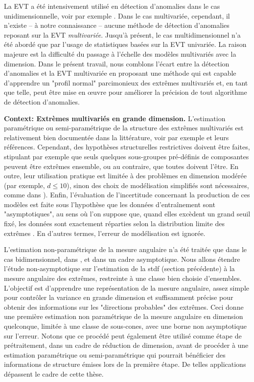 \documentclass[a4paper, 12pt]{article}
\begin{document}
La EVT a été intensivement utilisé en détection d'anomalies dans le cas unidimensionnelle, voir par exemple \cite{Roberts99, Roberts2000, Clifton2011, Clifton2008, Lee2008}. Dans le cas multivariée, cependant, il n'existe -- à notre connaissance -- aucune méthode de détection d'anomalies reposant sur la EVT \textit {multivariée}. Jusqu'à présent, le cas multidimensionnel n'a été abordé que par l'usage de statistiques basées sur la EVT univariée. La raison majeure est la difficulté du passage à l'échelle des modèles multivariés avec la dimension. Dans le présent travail, nous comblons l'écart entre la détection d'anomalies et la EVT multivariée en proposant une méthode qui est capable d'apprendre un "profil normal" parcimonieux des extrêmes multivariés et, en tant que telle, peut être mise en œuvre pour améliorer la précision de tout algorithme de détection d'anomalies.


\textbf{Context: Extrèmes multivariés en grande dimension.}
L'estimation paramétrique ou semi-paramétrique de la structure des extrêmes multivariés est relativement bien documentée dans la littérature, voir par exemple
\cite{coles1991modeling,fougeres2009models,cooley2010pairwise,sabourinNaveau2012} 
et leurs références. Cependant, des hypothèses structurelles restrictives doivent être faites, stipulant par exemple que seuls quelques sous-groupes pré-définis de composantes peuvent être extrêmes ensemble, ou au contraire, que toutes doivent l'être. En outre, leur utilisation pratique est limitée à des problèmes en dimension modérée (par exemple, $ d \le 10 $), sinon des choix de modélisation simplifiés sont nécessaires, comme dans \cite {stephenson2009high}). Enfin, l'évaluation de l'incertitude concernant la production de ces modèles est faite sous l'hypothèse que les données d'entraînement sont "asymptotiques", au sens où l'on suppose que, quand elles excèdent un grand seuil fixé, les données sont exactement réparties selon la distribution limite des extrêmes . En d'autres termes, l'erreur de modélisation est ignorée.


L'estimation non-paramétrique de la mesure angulaire n'a été traitée que dans le cas bidimensionnel, dans \cite{Einmahl2001, Einmahl2009}, et dans un cadre asymptotique. Nous allons étendre l'étude non-asymptotique sur l'estimation de la {\sc stdf} (section précédente) à la mesure angulaire des extrêmes, restreinte à une classe bien choisie d'ensembles. L'objectif est d'apprendre une représentation de la mesure angulaire, assez simple pour contrôler la variance en grande dimension et suffisamment précise pour obtenir des informations sur les "directions probables" des extrêmes. Ceci donne une première estimation non paramétrique de la mesure angulaire en dimension quelconque, limitée à une classe de sous-cones, avec une borne non asymptotique sur l'erreur.
Notons que ce procédé peut également être utilisé comme étape de prétraitement, dans un cadre de réduction de  dimension, avant de procéder à une estimation paramétrique ou semi-paramétrique qui pourrait bénéficier des informations de structure émises lors de la première étape. De telles applications dépassent le cadre de cette thèse.
\end{document}
